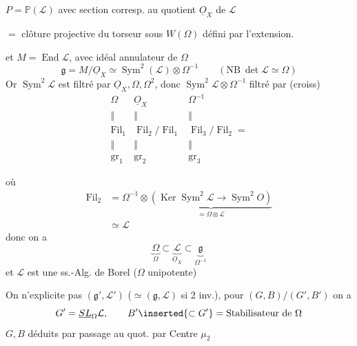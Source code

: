 $P=\mathbb P(\mathcal L)$ avec section corresp. au quotient
$\underline O_X$ de $\mathcal L$

$=$ clôture projective du torseur sous $W(\Omega)$ défini par l'extension.

et $M=\operatorname{End}\mathcal L$, avec idéal annulateur de $\Omega$
\[
\mathfrak g=M/\underline O_X\simeq\operatorname{Sym}^2(\mathcal L)
\otimes\Omega^{-1}\qquad(\mathrm{NB}\ \det\mathcal L\simeq\Omega)
\]
Or $\operatorname{Sym}^2\mathcal L$ est filtré par
 $\underline O_X,\Omega,\Omega^2$,
donc $\operatorname{Sym}^2\mathcal L\otimes\Omega^{-1}$ filtré par (croiss)
\[
\begin{array}{ccc}
\Omega&\underline O_X&\Omega^{-1}\\
\Vert&\Vert&\Vert\\
\operatorname{Fil}_1&\operatorname{Fil}_2/\operatorname{Fil}_1
&\operatorname{Fil}_3/\operatorname{Fil}_2=\\
\Vert&\Vert&\Vert\\
\operatorname{gr}_1&\operatorname{gr}_2&\operatorname{gr}_3
\end{array}
\]

où
\[
\begin{aligned}
\operatorname{Fil}_2
&=\Omega^{-1}\otimes
\underbrace{(\operatorname{Ker}\operatorname{Sym}^2\mathcal L
\longrightarrow\operatorname{Sym}^2 O)}_{\simeq\Omega\otimes\mathcal L}\\
&\simeq\mathcal L
\end{aligned}
\]
donc on a
\[
\underset{\Omega}{\underbrace{\Omega}}\subset
\underset{\underline O_X}{\underbrace{\mathcal L}}\subset
\underset{\Omega^{-1}}{\underbrace{\mathfrak g}}
\]
et $\mathcal L$ est une ss.-Alg. de Borel
($\Omega$  unipotente)


On n'explicite pas $(\mathfrak g',\mathcal L')$
($\simeq(\mathfrak g,\mathcal L)$ si 2 inv.), pour $(G,B)/(G',B')$ on a
\[
G'=\underline{SL}_{\Omega}\mathcal L,\qquad
B'\inserted{\subset G'}=\text{Stabilisateur de }\Omega
\]
$G,B$ déduits par passage au quot. par Centre $\mu_2$


